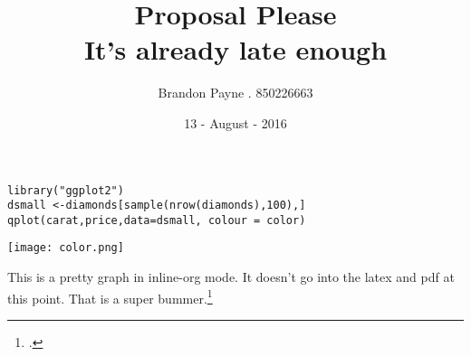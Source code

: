 \documentclass[koma, a4paper, utopia, 12pt]{article}
\author{Brandon Payne . 850226663\\
}
\date{13 - August - 2016}
\title{Proposal Please\\\medskip
\medium It's already late enough}
\begin{document}
\maketitle
\begin{verbatim}
library("ggplot2")
dsmall <-diamonds[sample(nrow(diamonds),100),]
qplot(carat,price,data=dsmall, colour = color)
\end{verbatim}

\texttt{[image: color.png]}

This is a pretty graph in inline-org mode.  It doesn't go into the latex and pdf at this point.
That is a super bummer.\footcite[][23-25]{ganzenboom1993}
\end{document}
